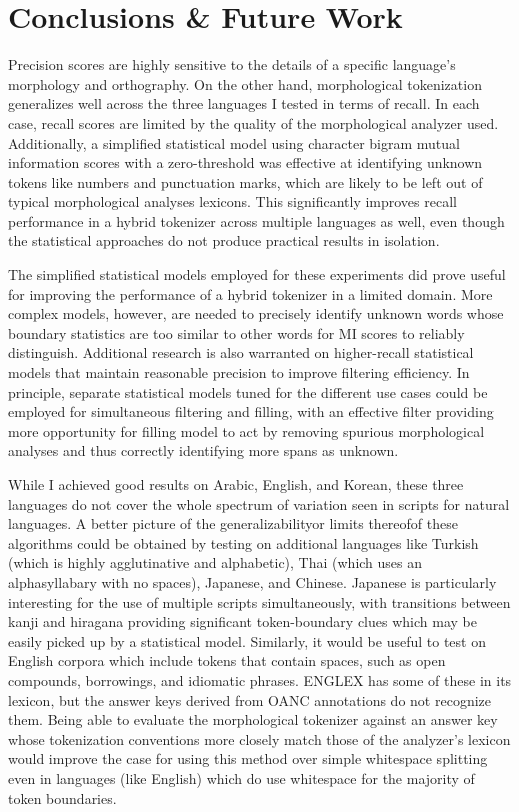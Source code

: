 \chapter{Conclusions \& Future Work}

Precision scores are highly sensitive to the details of a specific language's morphology and orthography. On the other hand, morphological tokenization generalizes well across the three languages I tested in terms of recall. In each case, recall scores are limited by the quality of the morphological analyzer used. Additionally, a simplified statistical model using character bigram mutual information scores with a zero-threshold was effective at identifying unknown tokens like numbers and punctuation marks, which are likely to be left out of typical morphological analyses lexicons. This significantly improves recall performance in a hybrid tokenizer across multiple languages as well, even though the statistical approaches do not produce practical results in isolation.

The simplified statistical models employed for these experiments did prove useful for improving the performance of a hybrid tokenizer in a limited domain. More complex models, however, are needed to precisely identify unknown words whose boundary statistics are too similar to other words for MI scores to reliably distinguish. Additional research is also warranted on higher-recall statistical models that maintain reasonable precision to improve filtering efficiency. In principle, separate statistical models tuned for the different use cases could be employed for simultaneous filtering and filling, with an effective filter providing more opportunity for filling model to act by removing spurious morphological analyses and thus correctly identifying more spans as unknown.

While I achieved good results on Arabic, English, and Korean, these three languages do not cover the whole spectrum of variation seen in scripts for natural languages. A better picture of the generalizability\textemdash or limits thereof\textemdash of these algorithms could be obtained by testing on additional languages like Turkish (which is highly agglutinative and alphabetic), Thai (which uses an alphasyllabary with no spaces), Japanese, and Chinese.
Japanese is particularly interesting for the use of multiple scripts simultaneously, with transitions between kanji and hiragana providing significant token-boundary clues which may be easily picked up by a statistical model. Similarly, it would be useful to test on English corpora which include tokens that contain spaces, such as open compounds, borrowings, and idiomatic phrases. ENGLEX has some of these in its lexicon, but the answer keys derived from OANC annotations do not recognize them. Being able to evaluate the morphological tokenizer against an answer key whose tokenization conventions more closely match those of the analyzer's lexicon would improve the case for using this method over simple whitespace splitting even in languages (like English) which do use whitespace for the majority of token boundaries.

